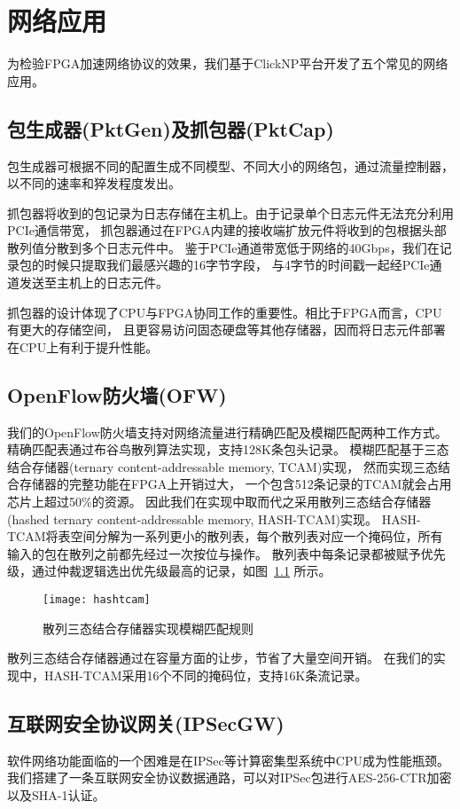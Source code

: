 \chapter{网络应用}
为检验FPGA加速网络协议的效果，我们基于ClickNP平台开发了五个常见的网络应用。

\section{包生成器(PktGen)及抓包器(PktCap)}
包生成器可根据不同的配置生成不同模型、不同大小的网络包，通过流量控制器，以不同的速率和猝发程度发出。

抓包器将收到的包记录为日志存储在主机上。由于记录单个日志元件无法充分利用PCIe通信带宽，
抓包器通过在FPGA内建的接收端扩放元件将收到的包根据头部散列值分散到多个日志元件中。
鉴于PCIe通道带宽低于网络的40Gbps，我们在记录包的时候只提取我们最感兴趣的16字节字段，
与4字节的时间戳一起经PCIe通道发送至主机上的日志元件。

抓包器的设计体现了CPU与FPGA协同工作的重要性。相比于FPGA而言，CPU有更大的存储空间，
且更容易访问固态硬盘等其他存储器，因而将日志元件部署在CPU上有利于提升性能。

\section{OpenFlow防火墙(OFW)}
我们的OpenFlow\cite{McKeown:2008:OEI:1355734.1355746}防火墙支持对网络流量进行精确匹配及模糊匹配两种工作方式。
精确匹配表通过布谷鸟散列算法\cite{Pagh2001}实现，支持128K条包头记录。
模糊匹配基于三态结合存储器(ternary content-addressable memory, TCAM)实现，
然而实现三态结合存储器的完整功能在FPGA上开销过大\cite{Bosshart:2013:FMF:2486001.2486011}，
一个包含512条记录的TCAM就会占用芯片上超过50\%的资源。
因此我们在实现中取而代之采用散列三态结合存储器(hashed ternary content-addressable memory, HASH-TCAM)实现。
HASH-TCAM将表空间分解为一系列更小的散列表，每个散列表对应一个掩码位，所有输入的包在散列之前都先经过一次按位与操作。
散列表中每条记录都被赋予优先级，通过仲裁逻辑选出优先级最高的记录，如图~\ref{fig:hashtcam} 所示。
\begin{figure}[htbp]
\centering
\texttt{[image: hashtcam]}
\caption{散列三态结合存储器实现模糊匹配规则} \label{fig:hashtcam}
\end{figure}

散列三态结合存储器通过在容量方面的让步，节省了大量空间开销。
在我们的实现中，HASH-TCAM采用16个不同的掩码位，支持16K条流记录。

\section{互联网安全协议网关(IPSecGW)}
软件网络功能面临的一个困难是在IPSec等计算密集型系统中CPU成为性能瓶颈\cite{Han:2010:PGS:1851275.1851207}。
我们搭建了一条互联网安全协议数据通路，可以对IPSec包进行AES-256-CTR加密以及SHA-1认证。

